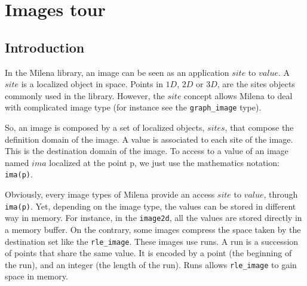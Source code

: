 






\section{Images tour}

\subsection{Introduction}


In the Milena library, an image can be seen as an application
$site$ to $value$.
A $site$ is a localized object in space.
Points in $1D$, $2D$ or $3D$, are the sites objects commonly used in the
library.
However, the $site$ concept allows Milena to deal with complicated image type
(for instance see the \verb+graph_image+ type).

So, an image is composed by a set of localized objects, $sites$, that
compose the definition domain of the image.
A value is associated to each site of the image. This is the destination domain
of the image.
To access to a value of an image named $ima$ localized at the point p, we
just use the mathematics notation: \verb+ima(p)+.

Obviously, every image types of Milena provide an access $site$ to $value$,
through \verb+ima(p)+. Yet, depending on the image type, the values can be
stored in different way in memory.
For instance, in the \verb+image2d+, all the values are stored directly in a
memory buffer.
On the contrary, some images compress the space taken by the destination set
like the \verb+rle_image+.
These images use runs.
A run is a succession of points that share the same value. It is encoded by
a point (the beginning of the run), and an integer (the length of the run).
Runs allows \verb+rle_image+ to gain space in memory.\\


